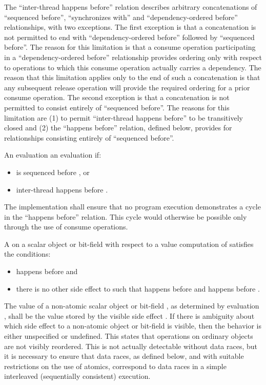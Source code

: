 \enternote The ``inter-thread happens before'' relation describes arbitrary
concatenations of ``sequenced before'', ``synchronizes with'' and
``dependency-ordered before'' relationships, with two exceptions. The first
exception is that a concatenation is not permitted to end with
``dependency-ordered before'' followed by ``sequenced before''. The reason for
this limitation is that a consume operation participating in a
``dependency-ordered before'' relationship provides ordering only with respect
to operations to which this consume operation actually carries a dependency. The
reason that this limitation applies only to the end of such a concatenation is
that any subsequent release operation will provide the required ordering for a
prior consume operation. The second exception is that a concatenation is not
permitted to consist entirely of ``sequenced before''. The reasons for this
limitation are (1) to permit ``inter-thread happens before'' to be transitively
closed and (2) the ``happens before'' relation, defined below, provides for
relationships consisting entirely of ``sequenced before''. \exitnote

\pnum
An evaluation   an evaluation  if:

\begin{itemize}
\item {} is sequenced before , or
\item {} inter-thread happens before .
\end{itemize}

The implementation shall ensure that no program execution demonstrates a cycle
in the ``happens before'' relation. \enternote This cycle would otherwise be
possible only through the use of consume operations. \exitnote

\pnum
A   on a scalar object or bit-field 
with respect to a value computation  of  satisfies the
conditions:

\begin{itemize}
\item {} happens before  and
\item there is no other
%
side effect  to  such that 
happens before  and  happens before .
\end{itemize}

The value of a non-atomic scalar object or bit-field , as determined by
evaluation , shall be the value stored by the
%
visible side effect
. \enternote If there is ambiguity about which side effect to a
non-atomic object or bit-field is visible, then the behavior is either
unspecified or undefined. \exitnote \enternote This states that operations on
ordinary objects are not visibly reordered. This is not actually detectable
without data races, but it is necessary to ensure that data races, as defined
below, and with suitable restrictions on the use of atomics, correspond to data
races in a simple interleaved (sequentially consistent) execution. \exitnote

